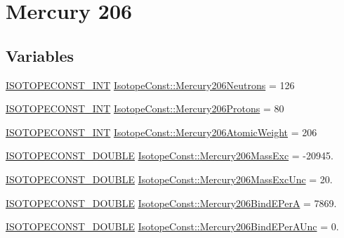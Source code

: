 \hypertarget{group___isotope_const-_mercury-_hg206}{}\section{Mercury 206}
\label{group___isotope_const-_mercury-_hg206}
\subsection*{Variables}
\begin{DoxyCompactItemize}
\item 
\mbox{\hyperlink{group___isotope_const-_macros_ga5f18360b3e99483a35c32d789e62621c}{I\+S\+O\+T\+O\+P\+E\+C\+O\+N\+S\+T\+\_\+\+I\+NT}} \mbox{\hyperlink{group___isotope_const-_mercury-_hg206_ga06ab3f5c22b5eb983eb99e915cfc7089}{Isotope\+Const\+::\+Mercury206\+Neutrons}} = 126
\item 
\mbox{\hyperlink{group___isotope_const-_macros_ga5f18360b3e99483a35c32d789e62621c}{I\+S\+O\+T\+O\+P\+E\+C\+O\+N\+S\+T\+\_\+\+I\+NT}} \mbox{\hyperlink{group___isotope_const-_mercury-_hg206_gaa23a1e5bdcfce95736666b71835bbb6d}{Isotope\+Const\+::\+Mercury206\+Protons}} = 80
\item 
\mbox{\hyperlink{group___isotope_const-_macros_ga5f18360b3e99483a35c32d789e62621c}{I\+S\+O\+T\+O\+P\+E\+C\+O\+N\+S\+T\+\_\+\+I\+NT}} \mbox{\hyperlink{group___isotope_const-_mercury-_hg206_ga60980eecc430fd04c26db44a927eb097}{Isotope\+Const\+::\+Mercury206\+Atomic\+Weight}} = 206
\item 
\mbox{\hyperlink{group___isotope_const-_macros_ga8f45a7272ce02c0b4c65c44636ed719a}{I\+S\+O\+T\+O\+P\+E\+C\+O\+N\+S\+T\+\_\+\+D\+O\+U\+B\+LE}} \mbox{\hyperlink{group___isotope_const-_mercury-_hg206_ga03edf37455200544842aea048672ac0e}{Isotope\+Const\+::\+Mercury206\+Mass\+Exc}} = -\/20945.
\item 
\mbox{\hyperlink{group___isotope_const-_macros_ga8f45a7272ce02c0b4c65c44636ed719a}{I\+S\+O\+T\+O\+P\+E\+C\+O\+N\+S\+T\+\_\+\+D\+O\+U\+B\+LE}} \mbox{\hyperlink{group___isotope_const-_mercury-_hg206_ga49f7582850a700a3a04468973c9c4239}{Isotope\+Const\+::\+Mercury206\+Mass\+Exc\+Unc}} = 20.
\item 
\mbox{\hyperlink{group___isotope_const-_macros_ga8f45a7272ce02c0b4c65c44636ed719a}{I\+S\+O\+T\+O\+P\+E\+C\+O\+N\+S\+T\+\_\+\+D\+O\+U\+B\+LE}} \mbox{\hyperlink{group___isotope_const-_mercury-_hg206_ga7a15d5680a4623d6202de0f017b790c8}{Isotope\+Const\+::\+Mercury206\+Bind\+E\+PerA}} = 7869.
\item 
\mbox{\hyperlink{group___isotope_const-_macros_ga8f45a7272ce02c0b4c65c44636ed719a}{I\+S\+O\+T\+O\+P\+E\+C\+O\+N\+S\+T\+\_\+\+D\+O\+U\+B\+LE}} \mbox{\hyperlink{group___isotope_const-_mercury-_hg206_ga16dff38ac6728ee6ea43af93b8c28308}{Isotope\+Const\+::\+Mercury206\+Bind\+E\+Per\+A\+Unc}} = 0.

\end{DoxyCompactItemize}
